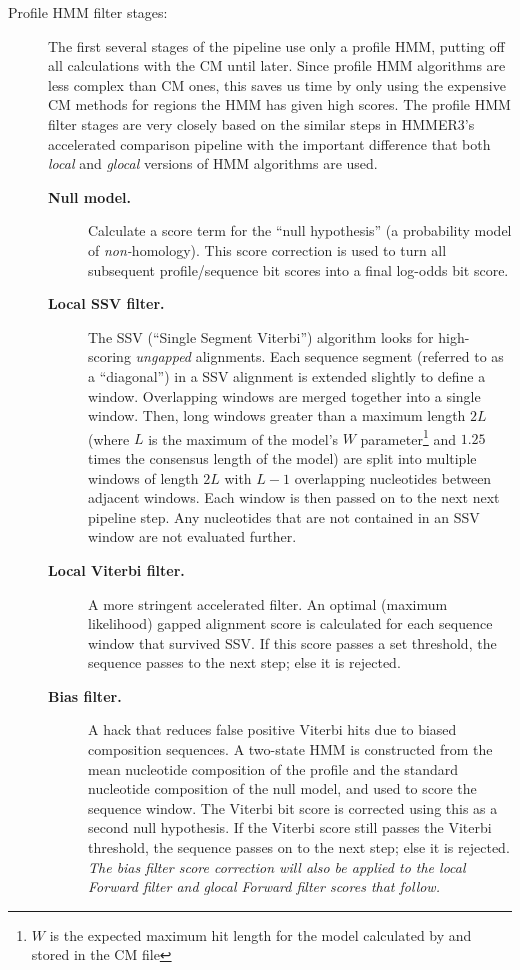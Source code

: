 \begin{description}
\item[Profile HMM filter stages:] The first several stages of the
  pipeline use only a profile HMM, putting off all calculations with
  the CM until later. Since profile HMM algorithms are less complex
  than CM ones, this saves us time by only using the expensive CM
  methods for regions the HMM has given high scores. The profile HMM
  filter stages are very closely based on the similar steps in
  HMMER3's accelerated comparison pipeline with the important
  difference that both \emph{local} and \emph{glocal} versions of HMM
  algorithms are used.
\begin{description}
\item[\textbf{Null model.}] Calculate a score term for the ``null
  hypothesis'' (a probability model of \emph{non-}homology). This
  score correction is used to turn all subsequent profile/sequence bit
  scores into a final log-odds bit score.
  
\item[\textbf{Local SSV filter.}] The SSV (``Single Segment Viterbi'')
  algorithm looks for high-scoring \emph{ungapped} alignments. Each
  sequence segment (referred to as a ``diagonal'') in a SSV alignment
  is extended slightly to define a window. Overlapping windows are
  merged together into a single window. Then, long windows greater
  than a maximum length $2L$ (where $L$ is the maximum of the model's
  $W$ parameter\footnote{$W$ is the expected maximum hit length for
  the model calculated by  and stored in the CM file}
  and $1.25$ times the consensus length of the model) are split into
  multiple windows of length $2L$ with $L-1$ overlapping nucleotides
  between adjacent windows. Each window is then passed on to the next
  next pipeline step. Any nucleotides that are not contained in an SSV
  window are not evaluated further.

\item[\textbf{Local Viterbi filter.}] A more stringent accelerated
  filter. An optimal (maximum likelihood) gapped alignment score is
  calculated for each sequence window that survived SSV. If this score
  passes a set threshold, the sequence passes to the next step; else
  it is rejected.

\item[\textbf{Bias filter.}] A hack that reduces false positive
  Viterbi hits due to biased composition sequences. A two-state HMM is
  constructed from the mean nucleotide composition of the profile and the
  standard nucleotide composition of the null model, and used to score
  the sequence window. The Viterbi bit score is corrected using this
  as a second null hypothesis. If the Viterbi score still passes the
  Viterbi threshold, the sequence passes on to the next step; else it
  is rejected. \emph{The bias filter score correction will also be applied
  to the local Forward filter and glocal Forward filter scores that
  follow.}
  

\end{description}
\end{description}
